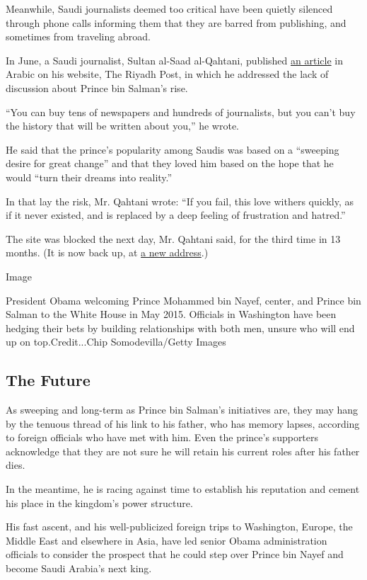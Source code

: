 Meanwhile, Saudi journalists deemed too critical have been quietly
silenced through phone calls informing them that they are barred from
publishing, and sometimes from traveling abroad.

In June, a Saudi journalist, Sultan al-Saad al-Qahtani, published
\href{http://riyadhpost.live/7848}{an article} in Arabic on his website,
The Riyadh Post, in which he addressed the lack of discussion about
Prince bin Salman's rise.

``You can buy tens of newspapers and hundreds of journalists, but you
can't buy the history that will be written about you,'' he wrote.

He said that the prince's popularity among Saudis was based on a
``sweeping desire for great change'' and that they loved him based on
the hope that he would ``turn their dreams into reality.''

In that lay the risk, Mr. Qahtani wrote: ``If you fail, this love
withers quickly, as if it never existed, and is replaced by a deep
feeling of frustration and hatred.''

The site was blocked the next day, Mr. Qahtani said, for the third time
in 13 months. (It is now back up, at \href{http://riyadhpost.live/}{a
new address}.)

Image

President Obama welcoming Prince Mohammed bin Nayef, center, and Prince
bin Salman to the White House in May 2015. Officials in Washington have
been hedging their bets by building relationships with both men, unsure
who will end up on top.Credit...Chip Somodevilla/Getty Images

\hypertarget{the-future}{%
\subsection{The Future}\label{the-future}}

As sweeping and long-term as Prince bin Salman's initiatives are, they
may hang by the tenuous thread of his link to his father, who has memory
lapses, according to foreign officials who have met with him. Even the
prince's supporters acknowledge that they are not sure he will retain
his current roles after his father dies.

In the meantime, he is racing against time to establish his reputation
and cement his place in the kingdom's power structure.

His fast ascent, and his well-publicized foreign trips to Washington,
Europe, the Middle East and elsewhere in Asia, have led senior Obama
administration officials to consider the prospect that he could step
over Prince bin Nayef and become Saudi Arabia's next king.


